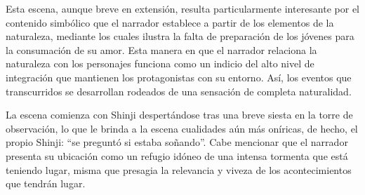 
Esta escena, aunque breve en extensión, resulta particularmente interesante por el contenido simbólico que el narrador establece a partir de los elementos de la naturaleza, mediante los cuales ilustra la falta de preparación de los jóvenes para la consumación de su amor.
Esta manera en que el narrador relaciona la naturaleza con los personajes funciona como un indicio del alto nivel de integración que mantienen los protagonistas con su entorno. 
Así, los eventos que transcurridos se desarrollan rodeados de una sensación de completa naturalidad.

La escena comienza con Shinji despertándose tras una breve siesta en la torre de observación, lo que le brinda a la escena cualidades aún más oníricas, de hecho, el propio Shinji: ``se preguntó si estaba soñando''.\autocite{mishima2006}
Cabe mencionar que el narrador presenta su ubicación como un refugio idóneo de una intensa tormenta que está teniendo lugar, misma que presagia la relevancia y viveza de los acontecimientos que tendrán lugar.

